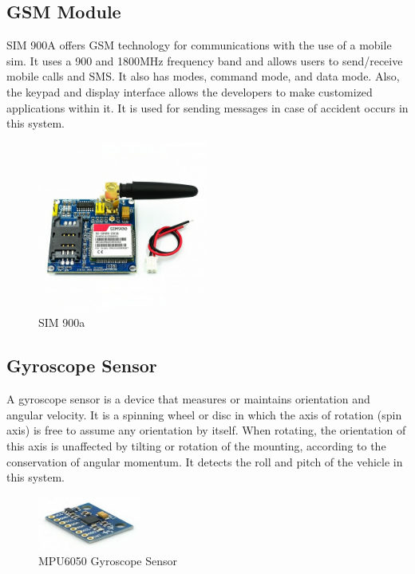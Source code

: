 \documentclass[12pt,a4paper]{report}
\begin{document}
	
	\subsection{GSM Module}
	\begin{justify}
SIM 900A offers GSM technology for communications with the use of a mobile sim. It uses a 900 and 1800MHz frequency band and allows users to send/receive mobile calls and SMS. It also has modes, command mode, and data mode. Also, the keypad and display interface allows the developers to make customized applications within it. It is used for sending messages in case of accident occurs in this system. 	
	\end{justify}
	\begin{figure}[ht]
	    \centering
	    \includegraphics[width=0.5\textwidth]{sim.jpeg}
	    \caption{SIM 900a}
	    \label{fig:enter-label}
	\end{figure}
	
	
	\subsection{Gyroscope Sensor}
	\begin{justify}
		A gyroscope sensor is a device that measures or maintains orientation and angular velocity. It is a spinning wheel or disc in which the axis of rotation (spin axis) is free to assume any orientation by itself. When rotating, the orientation of this axis is unaffected by tilting or rotation of the mounting, according to the conservation of angular momentum. It detects the roll and pitch of the vehicle in this system.
	\end{justify}
	\begin{figure}[ht]
	    \centering
	    \includegraphics[width=0.3\textwidth]{Picture6.jpg}
	    \caption{MPU6050 Gyroscope Sensor}
	    \label{fig:enter-label}
	\end{figure}
	
\end{document}
